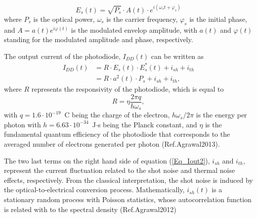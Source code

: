 \begin{equation}\label{Eq_Ein}
    E_s(t)=\sqrt{P_s}\cdot A(t)\cdot e^{i(\omega_s t+\varphi_s)}
\end{equation}
where ${P_s}$ is the optical power, $\omega_s$ is the carrier frequency, $\varphi_s$ is the initial phase, and $A=a(t)e^{i\varphi(t)}$ is the modulated envelop amplitude, with $a(t)$ and $\varphi(t)$ standing for the modulated amplitude and phase, respectively.

The output current of the photodiode, $I_{DD}(t)$ can be written as
\begin{align}\label{Eq_Iout1}
    I_{DD}(t) &= R\cdot E_s(t)\cdot E^*_s(t)+i_{sh}+i_{th}\\
              &= R\cdot a^2(t)\cdot P_s+i_{sh}+i_{th},\label{Eq_Iout2}
\end{align}
where $R$ represents the responsivity of the photodiode, which is equal to
\begin{equation}\label{Eq_Responsivity}
    R = \eta\frac{2\pi q}{h\omega_s},
\end{equation}
with $q=1.6\cdot10^{-19}$~C being the charge of the electron, $h\omega_s/2\pi$ is the energy per photon with $h=6.63\cdot10^{-34}$~J$\cdot$s being the Planck constant, and $\eta$ is the fundamental quantum efficiency of the photodiode that corresponds to the averaged number of electrons generated per photon (Ref.Agrawal2013).

The two last terms on the right hand side of equation (\ref{Eq_Iout2}), $i_{sh}$ and $i_{th}$, represent the current fluctuation related to the shot noise and thermal noise effects, respectively. From the classical interpretation, the shot noise is induced by the optical-to-electrical conversion process. Mathematically, $i_{sh}(t)$ is a stationary random process with Poisson statistics, whose autocorrelation function is related with to the spectral density (Ref.Agrawal2012)

